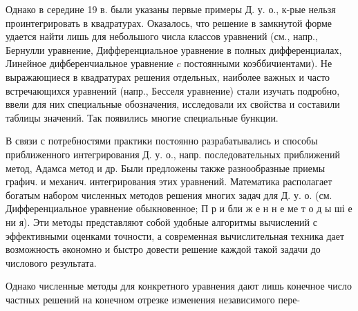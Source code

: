 \documentclass[10pt]{article}
\begin{document}
Однако в середине 19 в. были указаны первые примеры Д. у. о., к-рые нельзя проинтегрировать в квадратурах. Оказалось, что решение в замкнутой форме удается найти лишь для небольшого числа классов уравнений (см., напр., Бернулли уравнение, Дифференциальное уравнение в полных дифференциалах, Линейное дифберенчиальное уравнение $c$ постоянными коэббичиентами). Не выражающиеся в квадратурах решения отдельных, наиболее важных и часто встречающихся уравнений (напр., Бесселя уравнение) стали изучать подробно, ввели для них специальные обозначения, исследовали их свойства и составили таблицы значений. Так появились многие специальные бункции.



В связи с потребностями практики постоянно разрабатывались и способы приближенного интегрирования Д. у. о., напр. последовательных приближений метод, Адамса метод и др. Были предложены также разнообразные приемы графич. и механич. интегрирования этих уравнений. Математика располагает богатым набором численных методов решения многих задач для Д. у. о. (см. Дифференциальное уравнение обыкновенное; П р и бли ж е н н е ме т о д ы ші е ни я). Эти методы представляют собой удобные алгоритмы вычислений с эффективными оценками точности, а современная вычислительная техника дает возможность әкономно и быстро довести решение каждой такой задачи до числового результата.



Однако численные методы для конкретного уравнения дают лишь конечное число частных решений на конечном отрезке изменения независимого пере-
\end{document}
